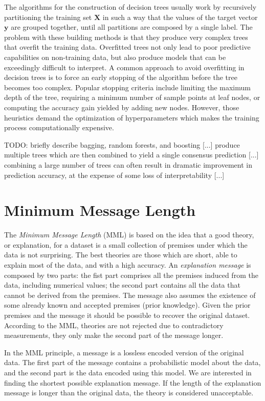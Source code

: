 The algorithms for the construction of decision trees usually work by recursively partitioning the training set $\mathbf{X}$ in such a way that the values of the target vector $\textbf{y}$ are grouped together, until all partitions are composed by a single label. The problem with these building methods is that they produce very complex trees that overfit the training data. Overfitted trees not only lead to poor predictive capabilities on non-training data, but also produce models that can be exceedingly difficult to interpret. A common approach to avoid overfitting in decision trees is to force an early stopping of the algorithm before the tree becomes too complex. Popular stopping criteria include limiting the maximum depth of the tree, requiring a minimum number of sample points at leaf nodes, or computing the accuracy gain yielded by adding new nodes. However, those heuristics demand the optimization of hyperparameters which makes the training process computationally expensive.

{\color{red} TODO: briefly describe bagging, random forests, and boosting [...] produce multiple trees which are then combined to yield a single consensus prediction [...] combining a large number of trees can often result in dramatic improvement in prediction accuracy, at the expense of some loss of interpretability [...]}

%
%
\section{Minimum Message Length}
\label{sec:MML}

The \emph{Minimum Message Length} (MML) is based on the idea that a good theory, or explanation, for a dataset is a small collection of premises under which the data is not surprising. The best theories are those which are short, able to explain most of the data, and with a high accuracy. An \emph{explanation message} is composed by two parts: the fist part comprises all the premises induced from the data, including numerical values; the second part contains all the data that cannot be derived from the premises. The message also assumes the existence of some already known and accepted premises (prior knowledge). Given the prior premises and the message it should be possible to recover the original dataset. According to the MML, theories are not rejected due to contradictory measurements, they only make the second part of the message longer.

In the MML principle, a message is a lossless encoded version of the original data. The first part of the message contains a probabilistic model about the data, and the second part is the data encoded using this model. We are interested in finding the shortest possible explanation message. If the length of the explanation message is longer than the original data, the theory is considered unacceptable.

